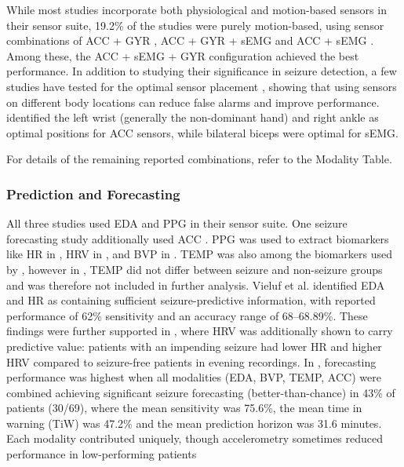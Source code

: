 While most studies incorporate both physiological and motion-based sensors in their sensor suite, 19.2\% of the studies were purely motion-based, using sensor combinations of ACC + GYR \cite{Larsen2024-vn, Dong2022-oo}, ACC + GYR + sEMG \cite{Wang2025-my, Gheryani2017-yg} and ACC + sEMG \cite{Milosevic2016-ee}. Among these, the ACC + sEMG + GYR configuration achieved the best performance. In addition to studying their significance in seizure detection, a few studies have tested for the optimal sensor placement \cite{Milosevic2016-ee, De_Cooman2018-pq}, showing that using sensors on different body locations can reduce false alarms and improve performance. \cite{Milosevic2016-ee} identified the left wrist (generally the non-dominant hand) and right ankle as optimal positions for ACC sensors, while bilateral biceps were optimal for sEMG. 

For details of the remaining reported combinations, refer to the Modality Table.

\subsubsection{Prediction and Forecasting}
All three studies used EDA and PPG in their sensor suite. One seizure forecasting study additionally used ACC \cite{Meisel2020-ii}. PPG was used to extract biomarkers like HR in \cite{Vieluf2023-ta, Vieluf2023-zv}, HRV in \cite{Vieluf2023-zv}, and BVP in \cite{Meisel2020-ii}. TEMP was also among the biomarkers used by \cite{Vieluf2023-zv, Meisel2020-ii}, however in \cite{Vieluf2023-zv}, TEMP did not differ between seizure and non-seizure groups and was therefore not included in further analysis. Vieluf et al. \cite{Vieluf2023-ta, Vieluf2023-zv} identified EDA and HR as containing sufficient seizure-predictive information, with reported performance of 62\% sensitivity and an accuracy range of 68–68.89\%. These findings were further supported in \cite{Vieluf2023-zv}, where HRV was additionally shown to carry predictive value: patients with an impending seizure had lower HR and higher HRV compared to seizure-free patients in evening recordings. In \cite{Meisel2020-ii}, forecasting performance was highest when all modalities (EDA, BVP, TEMP, ACC) were combined achieving significant seizure forecasting (better-than-chance) in 43\% of patients (30/69), where the mean sensitivity was 75.6\%, the mean time in warning (TiW) was 47.2\% and the mean prediction horizon was 31.6 minutes. Each modality contributed uniquely, though accelerometry sometimes reduced performance in low-performing patients
